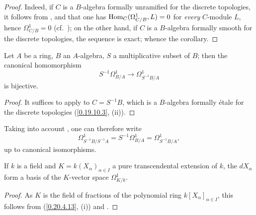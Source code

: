 \begin{proof}
Indeed, if $C$ is a $B$-algebra formally unramified for the discrete topologies, it follows from ,  and  that one has $\operatorname{Hom}_C(\Omega^1_{C/B},L)=0$ for \emph{every} $C$-module $L$, hence $\Omega^1_{C/B}=0$ (cf.\ ); on the other hand, if $C$ is a $B$-algebra formally smooth for the discrete topologies, the sequence  is exact; whence the corollary.
\end{proof}

\begin{corollary}[20.5.9]
\label{0.20.5.9}
Let $A$ be a ring, $B$ an $A$-algebra, $S$ a multiplicative subset of $B$; then the canonical homomorphism
\begin{equation}
\tag{20.5.9.1}
  \label{0.20.5.9.1}
  S^{-1}\Omega^1_{B/A}\to\Omega^1_{S^{-1}B/A}
\end{equation}
is bijective.
\end{corollary}

\begin{proof}
It suffices to apply  to $C=S^{-1}B$, which is a $B$-algebra formally \'{e}tale for the discrete topologies (\ref{0.19.10.3}, (ii)).
\end{proof}

Taking into account , one can therefore write
\begin{equation}
\tag{20.5.9.2}
  \label{0.20.5.9.2}
  \Omega^1_{S^{-1}B/S^{-1}A} = S^{-1}\Omega^1_{B/A} = \Omega^1_{S^{-1}B/A},
\end{equation}
up to canonical isomorphisms.

\begin{corollary}[20.5.10]
\label{0.20.5.10}
If $k$ is a field and $K=k(X_\alpha)_{\alpha\in I}$ a pure transcendental extension of $k$, the $dX_\alpha$ form a basis of the $K$-vector space $\Omega^1_{K/k}$.
\end{corollary}

\begin{proof}
As $K$ is the field of fractions of the polynomial ring $k[X_\alpha]_{\alpha\in I}$, this follows from (\ref{0.20.4.13}, (i)) and .
\end{proof}

